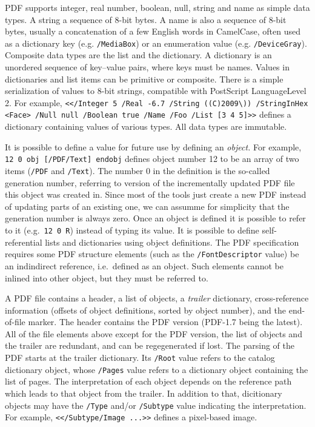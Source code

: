 \documentclass{ltugproc}
\begin{document}
PDF supports integer, real number, boolean, null, string and name as
simple data types. A string a sequence of 8-bit bytes. A name is also a
sequence of 8-bit bytes, usually a concatenation of a few English words in
CamelCase, often used as a dictionary key (e.g. \texttt{/MediaBox}) or an
enumeration value (e.g. \texttt{/DeviceGray}). Composite data types are the
list and the dictionary. A dictionary is an unordered sequence of key--value
pairs, where keys must be names. Values in dictionaries and list items can
be primitive or composite. There is a simple serialization of values to
8-bit strings, compatible with PostScript LanguageLevel\,2. For example,
\texttt{\hbox{<}</Integer 5 /Real -6.7 /String ((C)2009\textbackslash))
/StringInHex <Face> /Null null
/Boolean true /Name /Foo /List [3 4 5]\hbox{>}>} defines a dictionary
containing values of various types. All data types are immutable.

It is possible to define a value for future use by defining an
\emph{object.} For example, \texttt{12 0 obj [/PDF/Text] endobj} defines
object number 12 to be an array of two items (\texttt{/PDF} and
\texttt{/Text}). The number 0 in the definition is the so-called generation
number, referring to version of the incrementally updated PDF file this
object was created in. Since most of the tools just create a new PDF instead
of updating parts of an existing one, we can assumme for simplicity that the
generation number is always zero. Once an object is defined it is possible
to refer to it (e.g.\ \texttt{12 0 R}) instead of typing its value. It is
possible to define self-referential lists and dictionaries using object
definitions. The PDF specification requires some PDF structure elements
(such as the \texttt{/FontDescriptor} value) be an indindirect reference,
i.e.\ defined as an object. Such elements cannot be inlined into other
object, but they must be referred to.

A PDF file contains a header, a list of objects, a \emph{trailer}
dictionary, cross-reference information (offsets of object definitions,
sorted by object number), and the end-of-file marker. The header contains
the PDF version (PDF-1.7 being the latest). All of the file elements above
except for the PDF version, the list of objects and the trailer are
redundant, and can be regegenerated if lost. The parsing of the PDF starts
at the trailer dictionary. Its \texttt{/Root} value refers to the catalog
dictionary object, whose \texttt{/Pages} value refers to a dictionary object
containing the list of pages. The interpretation of each object depends on
the reference path which leads to that object from the trailer. In addition
to that, dicitionary objects may have the \texttt{/Type} and/or
\texttt{/Subtype} value indicating the interpretation. For example,
\texttt{\hbox{<}</Subtype/Image ...\hbox{>}>} defines a pixel-based image.
\end{document}
